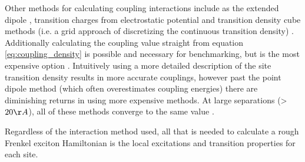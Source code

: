 Other methods for calculating coupling interactions include as the extended dipole \cite{Madjet2006a},
transition charges from electrostatic potential \cite{Madjet2006a, Renger2009} and
transition density cube methods (i.e. a grid approach of discretizing the continuous
transition density) \cite{Krueger1998}. Additionally calculating the coupling value
straight from equation \ref{eq:coupling_density} is possible and necessary for benchmarking, 
but is the most expensive option \cite{Kenny2016}. Intuitively using a more detailed
description of the site transition density results in more accurate couplings, however
past the point dipole method (which often overestimates coupling energies) there
are diminishing returns in using more expensive methods. At large separations (>$20 \AA{}$), 
all of these methods converge to the same value \cite{Kenny2016}.

Regardless of the interaction method used, all that is needed to calculate a rough
Frenkel exciton Hamiltonian is the local excitations and transition properties for 
each site.
 
